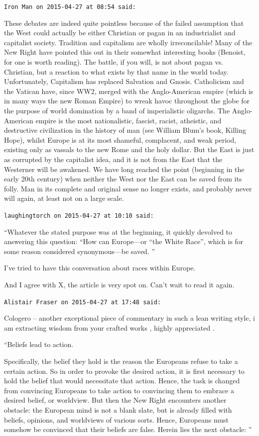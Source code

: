 \begin{footnotesize}
\begin{sffamily}
\texttt{Iron Man on 2015-04-27 at 08:54 said:}

These debates are indeed quite pointless because of the failed assumption that the West could actually be either Christian or pagan in an industrialist and capitalist society. Tradition and capitalism are wholly irreconcilable! Many of the New Right have pointed this out in their somewhat interesting books (Benoist, for one is worth reading). The battle, if you will, is not about pagan vs. Christian, but a reaction to what exists by that name in the world today. Unfortunately, Capitalism has replaced Salvation and Gnosis. Catholicism and the Vatican have, since WW2, merged with the Anglo-American empire (which is in many ways the new Roman Empire) to wreak havoc throughout the globe for the purpose of world domination by a band of imperialistic oligarchs. The Anglo-American empire is the most nationalistic, fascist, racist, atheistic, and destructive civilization in the history of man (see William Blum's book, Killing Hope), whilst Europe is at its most shameful, complacent, and weak period, existing only as vassals to the new Rome and the holy dollar. But the East is just as corrupted by the capitalist idea, and it is not from the East that the Westerner will be awakened. We have long reached the point (beginning in the early 20th century) when neither the West nor the East can be saved from its folly. Man in its complete and original sense no longer exists, and probably never will again, at least not on a large scale.

\hfill

\texttt{laughingtorch on 2015-04-27 at 10:10 said:}

``Whatever the stated purpose was at the beginning, it quickly devolved to answering this question: ``How can Europe---or ``the White Race'', which is for some reason considered synonymous---be saved. ''

I've tried to have this conversation about races within Europe.

And I agree with X, the article is very spot on. Can't wait to read it again.

\hfill

\texttt{Alistair Fraser on 2015-04-27 at 17:48 said:}

Cologero -- another exceptional piece of commentary in such a lean writing style, i am extracting wisdom from your crafted works , highly appreciated .

``Beliefs lead to action.

Specifically, the belief they hold is the reason the Europeans refuse to take a certain action. So in order to provoke the desired action, it is first necessary to hold the belief that would necessitate that action. Hence, the task is changed from convincing Europeans to take action to convincing them to embrace a desired belief, or worldview. But then the New Right encounters another obstacle: the European mind is not a blank slate, but is already filled with beliefs, opinions, and worldviews of various sorts. Hence, Europeans must somehow be convinced that their beliefs are false. Herein lies the next obstacle: ''


\end{sffamily}
\end{footnotesize}
